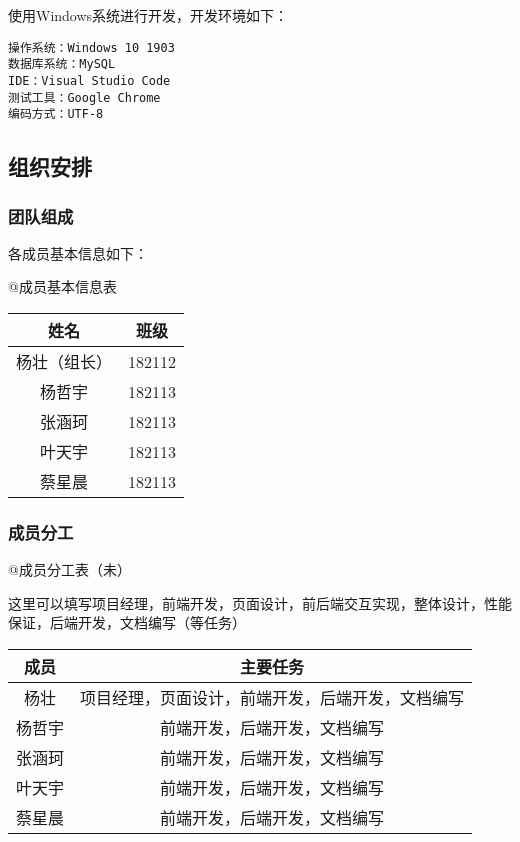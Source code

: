 \documentclass[
]{article}
\newenvironment{Shaded}{}{}
\newcommand{\NormalTok}[1]{#1}
\begin{document}
使用Windows系统进行开发，开发环境如下：

\begin{verbatim}
操作系统：Windows 10 1903
数据库系统：MySQL
IDE：Visual Studio Code
测试工具：Google Chrome
编码方式：UTF-8
\end{verbatim}

\hypertarget{header-n264}{%
\subsection{组织安排}\label{header-n264}}

\hypertarget{header-n265}{%
\subsubsection{团队组成}\label{header-n265}}

各成员基本信息如下：

@成员基本信息表

\begin{longtable}[]{@{}cc@{}}
\toprule
姓名 & 班级\tabularnewline
\midrule
\endhead
杨壮（组长） & 182112\tabularnewline
杨哲宇 & 182113\tabularnewline
张涵珂 & 182113\tabularnewline
叶天宇 & 182113\tabularnewline
蔡星晨 & 182113\tabularnewline
\bottomrule
\end{longtable}

\hypertarget{header-n287}{%
\subsubsection{成员分工}\label{header-n287}}

@成员分工表（未）

\begin{Shaded}
\begin{Highlighting}[]
\NormalTok{这里可以填写项目经理，前端开发，页面设计，前后端交互实现，整体设计，性能保证，后端开发，文档编写（等任务）}
\end{Highlighting}
\end{Shaded}

\begin{longtable}[]{@{}cc@{}}
\toprule
成员 & 主要任务\tabularnewline
\midrule
\endhead
杨壮 & 项目经理，页面设计，前端开发，后端开发，文档编写\tabularnewline
杨哲宇 & 前端开发，后端开发，文档编写\tabularnewline
张涵珂 & 前端开发，后端开发，文档编写\tabularnewline
叶天宇 & 前端开发，后端开发，文档编写\tabularnewline
蔡星晨 & 前端开发，后端开发，文档编写\tabularnewline
\bottomrule
\end{longtable}
\end{document}
